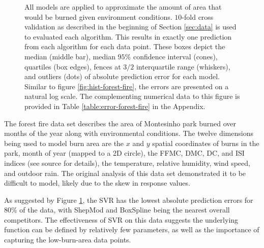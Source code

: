 \documentclass[smallextended,final]{svjour3}       %
\begin{document}
\begin{figure}
  \centering
  \caption{All models are applied to approximate the amount of area
    that would be burned given environment conditions. $10$-fold
    cross validation as described in the beginning of Section
    \ref{sec:data} is used to evaluated each algorithm. This results
    in exactly one prediction from each algorithm for each data
    point. These boxes depict the median (middle bar), median $95\%$
    confidence interval (cones), quartiles (box edges), fences at
    $3/2$ interquartile range (whiskers), and outliers (dots) of
    absolute prediction error for each model. Similar to figure
    \ref{fig:hist-forest-fire}, the errors are presented on a natural
    log scale. The complementing numerical data to this figure is
    provided in Table \ref{table:error-forest-fire} in the Appendix.}
  \label{fig:error-forest-fire}
\end{figure}


The forest fire data set \cite{cortez2007data} describes the area of
Montesinho park burned over months of the year along with
environmental conditions. The twelve dimensions being used to model
burn area are the $x$ and $y$ spatial coordinates of burns in the
park, month of year (mapped to a 2D circle), the FFMC, DMC, DC, and
ISI indices (see source for details), the temperature, relative
humidity, wind speed, and outdoor rain. The original analysis of this
data set demonstrated it to be difficult to model, likely due to the
skew in response values.

As suggested by Figure \ref{fig:error-forest-fire}, the SVR has the
lowest absolute prediction errors for 80\% of the data, with ShepMod
and BoxSpline being the nearest overall competitors. The effectiveness
of SVR on this data suggests the underlying function can be defined by
relatively few parameters, as well as the importance of capturing the
low-burn-area data points.
\end{document}
